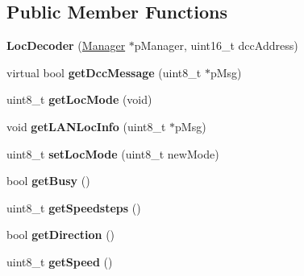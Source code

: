\subsection*{Public Member Functions}
\begin{DoxyCompactItemize}
\item 
\mbox{\label{classTBT_1_1LocDecoder_ae8563de74c15f27c40644bf8218d26d9}} 
{\bfseries Loc\+Decoder} (\hyperlink{classTBT_1_1Manager}{Manager} $\ast$p\+Manager, uint16\+\_\+t dcc\+Address)
\item 
\mbox{\label{classTBT_1_1LocDecoder_a00361e87af456a020bc6ec16c08237ef}} 
virtual bool {\bfseries get\+Dcc\+Message} (uint8\+\_\+t $\ast$p\+Msg)
\item 
\mbox{\label{classTBT_1_1LocDecoder_afaa04ad0561a39212d69d0aabece751e}} 
uint8\+\_\+t {\bfseries get\+Loc\+Mode} (void)
\item 
\mbox{\label{classTBT_1_1LocDecoder_a257c294961f07e5f2134b1550355a661}} 
void {\bfseries get\+L\+A\+N\+Loc\+Info} (uint8\+\_\+t $\ast$p\+Msg)
\item 
\mbox{\label{classTBT_1_1LocDecoder_a0ed2026cd64ba1e2aa411e1228027f4e}} 
uint8\+\_\+t {\bfseries set\+Loc\+Mode} (uint8\+\_\+t new\+Mode)
\item 
\mbox{\label{classTBT_1_1LocDecoder_a3ec11c7c270d1eeb00e6893bff8f0831}} 
bool {\bfseries get\+Busy} ()
\item 
\mbox{\label{classTBT_1_1LocDecoder_ae89a770202444bca60595182fe4a9c90}} 
uint8\+\_\+t {\bfseries get\+Speedsteps} ()
\item 
\mbox{\label{classTBT_1_1LocDecoder_a5c570e65adde5ee526986155d509da47}} 
bool {\bfseries get\+Direction} ()
\item 
\mbox{\label{classTBT_1_1LocDecoder_a7305c8ab02a76b48b2b5ab93f1aec24b}} 
uint8\+\_\+t {\bfseries get\+Speed} ()
\item 
\mbox{\label{classTBT_1_1LocDecoder_a7f4c04a5a306ea827494b29789cc401e}} 

\end{DoxyCompactItemize}
